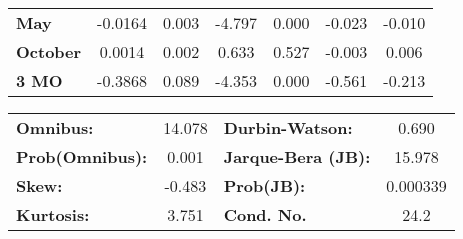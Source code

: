 \begin{center}
\begin{tabular}{lcccccc}
\textbf{May}      &      -0.0164  &        0.003     &    -4.797  &         0.000        &       -0.023    &       -0.010     \\
\textbf{October}  &       0.0014  &        0.002     &     0.633  &         0.527        &       -0.003    &        0.006     \\
\textbf{3 MO}     &      -0.3868  &        0.089     &    -4.353  &         0.000        &       -0.561    &       -0.213     \\
\bottomrule
\end{tabular}
\begin{tabular}{lclc}
\textbf{Omnibus:}       & 14.078 & \textbf{  Durbin-Watson:     } &    0.690  \\
\textbf{Prob(Omnibus):} &  0.001 & \textbf{  Jarque-Bera (JB):  } &   15.978  \\
\textbf{Skew:}          & -0.483 & \textbf{  Prob(JB):          } & 0.000339  \\
\textbf{Kurtosis:}      &  3.751 & \textbf{  Cond. No.          } &     24.2  \\
\bottomrule
\end{tabular}
\end{center}

